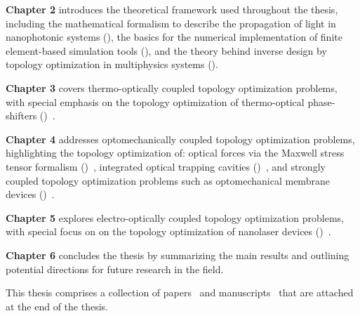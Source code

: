  \textbf{Chapter 2} introduces the theoretical framework used throughout the thesis, including the mathematical formalism
  to describe the propagation of light in nanophotonic systems (), the basics for the numerical implementation of 
  finite element-based simulation tools (), and the theory behind inverse design by topology optimization in multiphysics systems ().
  
  \textbf{Chapter 3} covers thermo-optically coupled topology optimization problems, with 
  special emphasis on the topology optimization of thermo-optical phase-shifters ()~\cite{ownpub0}.

  
  \textbf{Chapter 4} addresses optomechanically coupled topology optimization problems, highlighting the topology optimization of: optical forces via
  the Maxwell stress tensor formalism ()~\cite{ownpub2}, integrated optical trapping cavities ()~\cite{ownpub1, ownpub3}, and strongly coupled topology optimization 
  problems such as optomechanical membrane devices ()~\cite{ownpub5}.
  
  \textbf{Chapter 5} explores electro-optically coupled topology optimization problems, with special focus on on the topology optimization of 
  nanolaser devices ()~\cite{ownpub4}.
  
  \textbf{Chapter 6} concludes the thesis by summarizing the main results and outlining potential directions for future research in the field.

This thesis comprises a collection of papers~\cite{ownpub0, ownpub1, ownpub2, ownpub3} and manuscripts~\cite{ownpub4, ownpub5} that
are attached at the end of the thesis.